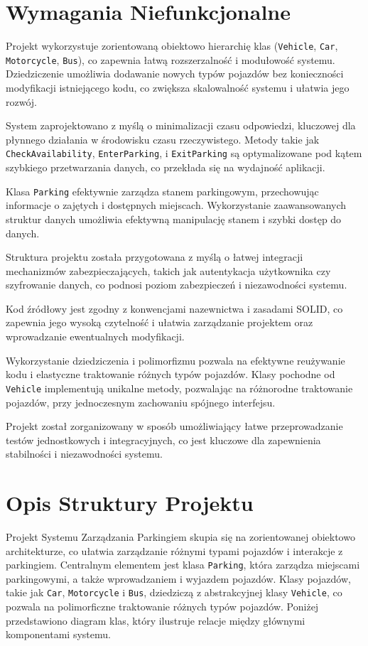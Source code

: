 \documentclass{article}
\begin{document}
\section{Wymagania Niefunkcjonalne}

Projekt wykorzystuje zorientowaną obiektowo hierarchię klas (\texttt{Vehicle}, \texttt{Car}, \texttt{Motorcycle}, \texttt{Bus}), co zapewnia łatwą rozszerzalność i modułowość systemu. Dziedziczenie umożliwia dodawanie nowych typów pojazdów bez konieczności modyfikacji istniejącego kodu, co zwiększa skalowalność systemu i ułatwia jego rozwój.

System zaprojektowano z myślą o minimalizacji czasu odpowiedzi, kluczowej dla płynnego działania w środowisku czasu rzeczywistego. Metody takie jak \texttt{CheckAvailability}, \texttt{EnterParking}, i \texttt{ExitParking} są optymalizowane pod kątem szybkiego przetwarzania danych, co przekłada się na wydajność aplikacji.

Klasa \texttt{Parking} efektywnie zarządza stanem parkingowym, przechowując informacje o zajętych i dostępnych miejscach. Wykorzystanie zaawansowanych struktur danych umożliwia efektywną manipulację stanem i szybki dostęp do danych.

Struktura projektu została przygotowana z myślą o łatwej integracji mechanizmów zabezpieczających, takich jak autentykacja użytkownika czy szyfrowanie danych, co podnosi poziom zabezpieczeń i niezawodności systemu.

Kod źródłowy jest zgodny z konwencjami nazewnictwa i zasadami SOLID, co zapewnia jego wysoką czytelność i ułatwia zarządzanie projektem oraz wprowadzanie ewentualnych modyfikacji.

Wykorzystanie dziedziczenia i polimorfizmu pozwala na efektywne reużywanie kodu i elastyczne traktowanie różnych typów pojazdów. Klasy pochodne od \texttt{Vehicle} implementują unikalne metody, pozwalając na różnorodne traktowanie pojazdów, przy jednoczesnym zachowaniu spójnego interfejsu.

Projekt został zorganizowany w sposób umożliwiający łatwe przeprowadzanie testów jednostkowych i integracyjnych, co jest kluczowe dla zapewnienia stabilności i niezawodności systemu.
\clearpage
\section{Opis Struktury Projektu}

Projekt Systemu Zarządzania Parkingiem skupia się na zorientowanej obiektowo architekturze, co ułatwia zarządzanie różnymi typami pojazdów i interakcje z parkingiem. Centralnym elementem jest klasa \texttt{Parking}, która zarządza miejscami parkingowymi, a także wprowadzaniem i wyjazdem pojazdów. Klasy pojazdów, takie jak \texttt{Car}, \texttt{Motorcycle} i \texttt{Bus}, dziedziczą z abstrakcyjnej klasy \texttt{Vehicle}, co pozwala na polimorficzne traktowanie różnych typów pojazdów. Poniżej przedstawiono diagram klas, który ilustruje relacje między głównymi komponentami systemu.
\end{document}
